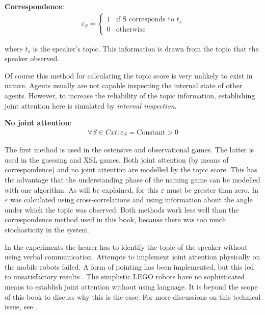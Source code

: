 \begin{description}
\item {\bf Correspondence}:
\begin{eqnarray}\varepsilon_S = \left \{ \begin{array}{rl}
1 & \mbox{if S corresponds to } t_s\\
0 & \mbox{otherwise}
\end{array}
\right.
\end{eqnarray}

\noindent
where $t_s$ is the speaker's topic. This information is drawn from the topic that the speaker observed.

Of course this method for calculating the topic score is very unlikely to exist in nature. Agents usually are not capable inspecting the internal state of other agents. However, to increase the reliability of the topic information, establishing joint attention here is simulated by {\em internal inspection}.

\item {\bf No joint attention}:
\begin{eqnarray}
\forall S \in Cxt: \varepsilon_S=\mbox{Constant}>0
\end{eqnarray}
\end{description}

\noindent
The first method is used in the ostensive and observational games. The latter is used in the guessing and XSL games. Both joint attention (by means of correspondence) and no joint attention are modelled by the topic score. This has the advantage that the understanding phase of the naming game can be modelled with one algorithm. As will be explained, for this $\varepsilon$ must be greater than zero. In \citep{vogt:1998b} $\varepsilon$ was calculated using cross-correlations and using information about the angle under which the topic was observed. Both methods work less well than the correspondence method used in this book, because there was too much stochasticity in the system.

In the experiments the hearer has to identify the topic of the speaker without using verbal communication. Attempts to implement joint attention physically on the mobile robots failed. A form of pointing has been implemented, but this led to unsatisfactory results \citep{steelsvogt:1997,vogt:1998a}. The simplistic LEGO robots have no sophisticated means to establish joint attention without using language. It is beyond the scope of this book to discuss why this is the case. For more discussions on this technical issue, see \citep{vogt:1998b,vogt:1998c}. 

